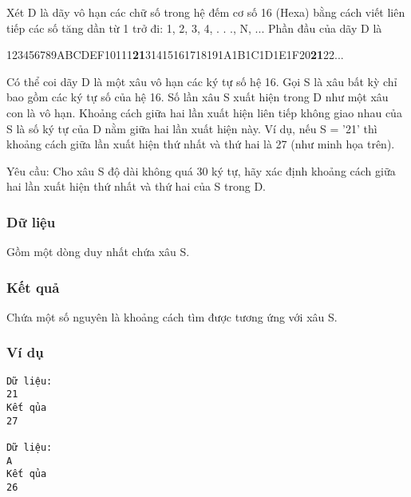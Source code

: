 

Xét D là dãy vô hạn các chữ số trong hệ đếm cơ số 16 (Hexa) bằng cách viết liên tiếp các số tăng dần từ 1 trở đi: 1, 2, 3, 4, . . ., N, ... Phần đầu của dãy D là

123456789ABCDEF10111\textbf{21}31415161718191A1B1C1D1E1F20\textbf{21}22...

Có thể coi dãy D là một xâu vô hạn các ký tự số hệ 16. Gọi S là xâu bất kỳ chỉ bao gồm các ký tự số của hệ 16. Số lần xâu S xuất hiện trong D như một xâu con là vô hạn. Khoảng cách giữa hai lần xuất hiện liên tiếp không giao nhau của S là số ký tự của D nằm giữa hai lần xuất hiện này. Ví dụ, nếu S = ’21’ thì khoảng cách giữa lần xuất hiện thứ nhất và thứ hai là 27 (như minh họa trên).

Yêu cầu: Cho xâu S độ dài không quá 30 ký tự, hãy xác định khoảng cách giữa hai lần xuất hiện thứ nhất và thứ hai của S trong D.

\subsubsection{Dữ liệu}

Gồm một dòng duy nhất chứa xâu S.

\subsubsection{Kết quả}

Chứa một số nguyên là khoảng cách tìm được tương ứng với xâu S.

\subsubsection{Ví dụ}
\begin{verbatim}
Dữ liệu:
21
Kết qủa
27

Dữ liệu:
A
Kết qủa
26
\end{verbatim}